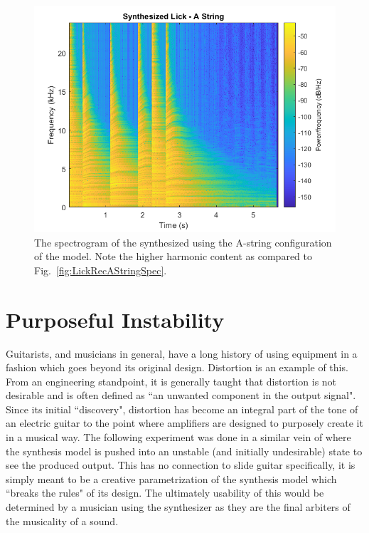 \documentclass[../main.tex]{subfiles}
\begin{document}
\begin{figure}[h]
    \centering
    \includegraphics[scale=.65]{./images/plots/LickSynthAString.png}
    \caption{The spectrogram of the synthesized using the A-string configuration of the model. Note the higher harmonic content as compared to Fig.~\ref{fig:LickRecAStringSpec}.}
    \label{fig:LickSynthAStringSpec}
\end{figure}

\clearpage

\section{Purposeful Instability}
Guitarists, and musicians in general, have a long history of using equipment in a fashion which goes beyond its original design. Distortion is an example of this. From an engineering standpoint, it is generally taught that distortion is not desirable and is often defined as ``an unwanted component in the output signal". Since its initial ``discovery", distortion has become an integral part of the tone of an electric guitar to the point where amplifiers are designed to purposely create it in a musical way. The following experiment was done in a similar vein of where the synthesis model is pushed into an unstable (and initially undesirable) state to see the produced output. This has no connection to slide guitar specifically, it is simply meant to be a creative parametrization of the synthesis model which ``breaks the rules" of its design. The ultimately usability of this would be determined by a musician using the synthesizer as they are the final arbiters of the musicality of a sound.
\end{document}
